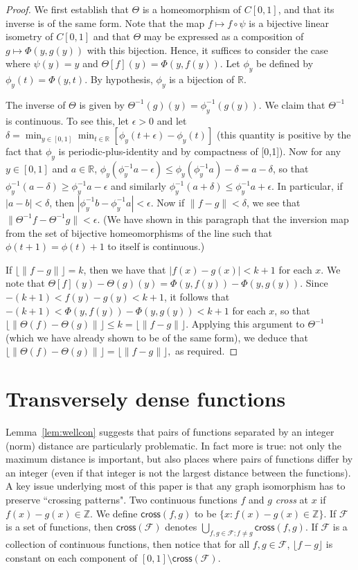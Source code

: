 \documentclass{daj}
\newcommand{\R}{\mathbb R}
\newcommand{\Z}{\mathbb Z}
\newcommand{\cross}{\mathsf{cross}}
\begin{document}
\begin{proof}
We first establish that $\Theta$ is a homeomorphism of $C[0,1]$, and that its inverse is of the
same form.
Note that the map $f\mapsto f\circ\psi$ is a bijective linear isometry
of $C[0,1]$ and that $\Theta$ may be expressed as a composition of $g\mapsto \Phi(y,g(y))$
with this bijection. Hence, it suffices to consider the case where $\psi(y)=y$ and $\Theta[f](y)=
\Phi(y,f(y))$.
Let $\phi_y$ be defined by $\phi_y(t)=\Phi(y,t)$. By hypothesis, $\phi_y$ is a
bijection of $\R$.

The inverse of $\Theta$ is given by $\Theta^{-1}(g)(y)=
\phi_y^{-1}(g(y))$. We claim that $\Theta^{-1}$ is continuous.
To see this, let $\epsilon>0$ and let $\delta=\min_{y\in[0,1]}\min_{t\in\R}[\phi_y(t+\epsilon)-\phi_y(t)]$
(this quantity is positive by the fact that $\phi_y$ is periodic-plus-identity and by compactness of [0,1]).
Now for any $y\in [0,1]$ and $a\in\R$,
$\phi_y(\phi_y^{-1}a-\epsilon)\le \phi_y(\phi_y^{-1}a)-\delta=a-\delta$, so that
$\phi_y^{-1}(a-\delta)\ge\phi_y^{-1}a-\epsilon$ and similarly
$\phi_y^{-1}(a+\delta)\le\phi_y^{-1}a+\epsilon$.
In particular, if $|a-b|<\delta$, then $|\phi_y^{-1}b-\phi_y^{-1}a|<\epsilon$.
Now if $\|f-g\|<\delta$, we see that $\|\Theta^{-1}f-\Theta^{-1}g\|<\epsilon$. (We have shown
in this paragraph that the inversion map from the set of bijective
homeomorphisms of the line such that $\phi(t+1)=\phi(t)+1$ to itself is continuous.)

If $\lfloor \|f-g\|\rfloor=k$, then we have that $|f(x)-g(x)|<k+1$ for each $x$.
We note that $\Theta[f](y)-\Theta(g)(y)=\Phi(y,f(y))-
\Phi(y,g(y))$. Since $-(k+1)<f(y)-g(y)<k+1$,
it follows that $-(k+1)<\Phi(y,f(y))-\Phi(y,g(y))<k+1$ for each $x$,
so that $\lfloor \|\Theta(f)-\Theta(g)\|\rfloor\le k=\lfloor \|f-g\|\rfloor$. Applying this argument to
$\Theta^{-1}$ (which we have already shown to be of the same form),
we deduce that $\lfloor\|\Theta(f)-\Theta(g)\|\rfloor=\lfloor\|f-g\|\rfloor,$
as required.
\end{proof}


\section{Transversely dense functions}
Lemma~\ref{lem:wellcon} suggests that pairs of functions separated by an
integer (norm) distance are particularly problematic.
In fact more is true: not only the maximum distance is important,
but also places where pairs of functions differ by an integer (even if that integer is
not the largest distance between the functions).
A key issue underlying most of this paper is that any graph isomorphism
has to preserve ``crossing patterns". Two continuous functions $f$ and $g$
\emph{cross} at $x$ if $f(x)-g(x)\in\Z$. We define $\cross(f,g)$ to be
$\{x\colon f(x)-g(x)\in\Z\}$. If $\mathcal F$ is a set of functions, then $\cross(\mathcal F)$ denotes $\bigcup_{f,g\in\mathcal F; f\ne g}
\cross(f,g)$. If $\mathcal F$ is a collection of continuous functions, then
notice that for all $f,g\in\mathcal F$, $\lfloor f-g\rfloor$ is constant on each
component of $[0,1]\setminus\cross(\mathcal F)$.
\end{document}

